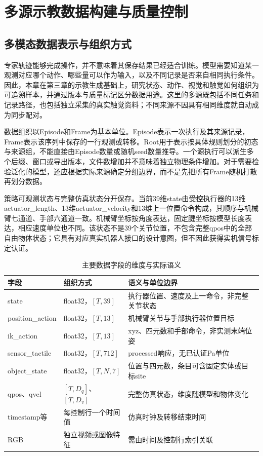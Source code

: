 \chapter{多源示教数据构建与质量控制}
\label{chap:multimodal_data}

\section{多模态数据表示与组织方式}
\label{sec:data_representation}

专家轨迹能够完成操作，并不意味着其保存结果已经适合训练\cite{mandlekar2022demonstrations}。模型需要知道某一观测对应哪个动作、哪些量可以作为输入，以及不同记录是否来自相同执行条件。因此，本章在第三章的示教生成基础上，研究状态、动作、视觉和触觉如何组织为可追溯样本，并通过版本与质量标记区分数据用途。这里的多源既包括不同任务和记录路径，也包括独立采集的真实触觉资料；不同来源不因具有相同维度就自动成为同步配对。

数据组织以Episode和Frame为基本单位。Episode表示一次执行及其来源记录，Frame表示该序列中保存的一行观测或转移。Root用于表示按具体规则划分的初态与来源组，不能直接由Episode数量或随机seed数量推导。一个源执行可以派生多个后缀、窗口或导出版本，文件数增加并不意味着独立物理条件增加。对于需要检验泛化的模型，还应根据实际来源确定分组边界，而不是先把所有Frame随机打散再划分数据。

策略可观测状态与完整仿真状态分开保存。当前39维state由受控执行器的13维actuator\_length、13维actuator\_velocity和13维上一位置命令构成，其顺序与机械臂七通道、手部六通道一致。机械臂坐标按角度表达，固定腱坐标按模型长度表达，相应速度单位也不同。该状态不是39个关节位置，不包含完整qpos中的全部自由物体状态；它具有对应真实机器人接口的设计意图，但不因此获得实机信号标定认证。

\begin{table}[htbp]
 \centering\small
 \caption{主要数据字段的维度与实际语义}
 \label{tab:ch04_fields}
 \begin{tabular}{p{}p{}p{}}
 \hline
 字段 & 组织方式 & 语义与单位边界\\
 \hline
 state & float32，$[T,39]$ & 执行器位置、速度及上一命令，非完整关节状态\\
 position\_action & float32，$[T,13]$ & 机械臂关节与手部执行器位置目标\\
 ik\_action & float32，$[T,13]$ & xyz、四元数和手部命令，非实测末端位姿\\
 sensor\_tactile & float32，$[T,712]$ & processed响应，无已认证Pa单位\\
 object\_state & float32，$[T,N,7]$ & 位置与四元数，条目可含固定实体或目标site\\
 qpos、qvel & $[T,D_q]$、$[T,D_v]$ & 完整仿真状态，维度随模型和物体变化\\
 timestamp等 & 每控制行一个时间值 & 仿真时钟及转移结束时间\\
 RGB & 独立视频或图像特征 & 需由时间及控制行索引关联\\
 \hline
 \end{tabular}
\end{table}

